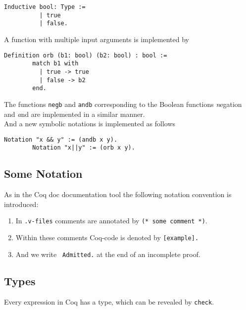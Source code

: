 	    \label{Def:booleans}
	    \begin{lstlisting}[caption= \lstinline!bool!]    
	    Inductive bool: Type :=
	      | true
	      | false.
	    \end{lstlisting}
	     A function with multiple input arguments is implemented by
	    \begin{lstlisting}[caption = \lstinline!orb!]
	    Definition orb (b1: bool) (b2: bool) : bool :=
	    match b1 with
		  | true -> true
		  | false -> b2
	    end.
	    \end{lstlisting}    
	    The functions \lstinline!negb! and \lstinline!andb! corresponding to the Boolean functions {\emph negation} and {\emph and} are implemented in a similar manner.\\   
	    And a new symbolic notations is implemented as follows
	    \begin{lstlisting}[caption= introducing a new notation]
	    Notation "x && y" := (andb x y).
	    Notation "x||y" := (orb x y).
	    \end{lstlisting}
	    
	\subsection{Some Notation}
	    As in the Coq doc documentation tool the following notation convention is introduced:
	     
	    \begin{enumerate}
	     \item In \texttt{.v-files} comments are annotated by \lstinline!(* some comment *)!. 
	     \item Within these comments Coq-code is denoted by \lstinline![example].! 
	     \item And we write \lstinline! Admitted.! at the end of an incomplete proof.    
	     \end{enumerate}
	     
	\subsection{Types}
	     Every expression in Coq has a type, which can be revealed by \lstinline!check!. 

